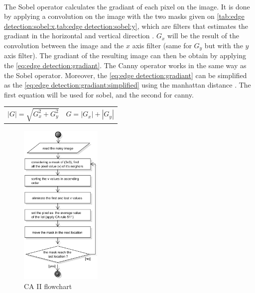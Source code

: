 

~~ 

The Sobel operator calculates the gradiant of each pixel on the image. It is done by applying a convolution on the image with the two masks given on \vref{tab:edge detection:sobel:x,tab:edge detection:sobel:y}, which are filters that estimates the gradiant in the horizontal and vertical direction  \cite{bib:filter:sobelRuby}. $G_x$ will be the result of the convolution between the image and the $x$ axis filter (same for $G_y$ but with the $y$ axis filter). The gradiant of the resulting image can then be obtain by applying the \vref{eq:edge detection:gradiant}. The Canny operator works in the same way as the Sobel operator. Moreover, the \vref{eq:edge detection:gradiant} can be simplified as the \vref{eq:edge detection:gradiant:simplified} using the manhattan distance \cite{bib:filter:canny}. The first equation will be used for sobel, and the second for canny. 


\noindent\begin{tabularx}{\textwidth}{@{}XX@{}}
	\begin{equation} \label{eq:edge detection:gradiant}
		|G| = \sqrt{G_{x}^2 + G_{y}^2}
	\end{equation} & 
	\begin{equation} \label{eq:edge detection:gradiant:simplified}
		G = |G_x| + |G_y|
	\end{equation}
\end{tabularx}




\begin{figure}
	\centering
	\includegraphics[width=0.35\textwidth]{images/diagrams/flowchart_CAII}
	\caption{CA II flowchart \cite{bib:filter:CA}}
	\label{fig:diagram:flowchart:CAII}
\end{figure}


